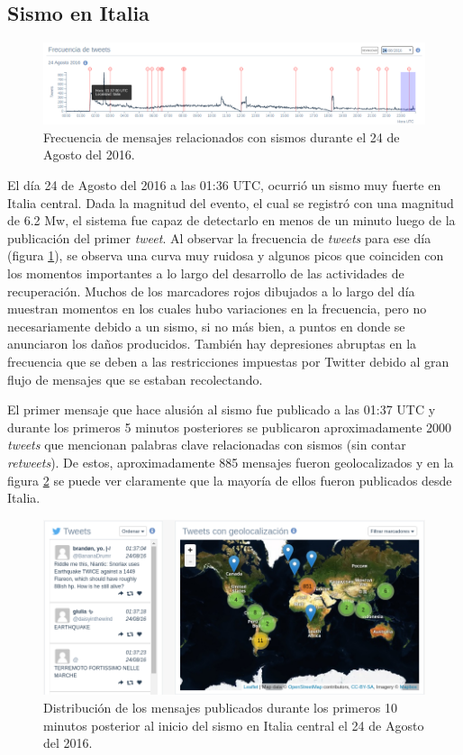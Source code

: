 	\subsection{Sismo en Italia}
	
	\begin{figure}[!h]
	  \centering
	  \includegraphics[width=\textwidth]{imagenes/sismoitaliafreq.png}
	  \caption{Frecuencia de mensajes relacionados con sismos durante el 24 de Agosto del 2016.}
		\label{fig:timeline-italia} 
	\end{figure}
	
	El día 24 de Agosto del 2016 a las 01:36 UTC, ocurrió un sismo muy fuerte en Italia central. Dada la magnitud del evento, el cual se registró con una magnitud de 6.2 Mw, el sistema fue capaz de detectarlo en menos de un minuto luego de la publicación del primer \textit{tweet}. Al observar la frecuencia de \textit{tweets} para ese día (figura \ref{fig:timeline-italia}), se observa una curva muy ruidosa y algunos picos que coinciden con los momentos importantes a lo largo del desarrollo de las actividades de recuperación. Muchos de los marcadores rojos dibujados a lo largo del día muestran momentos en los cuales hubo variaciones en la frecuencia, pero no necesariamente debido a un sismo, si no más bien, a puntos en donde se anunciaron los daños producidos. También hay depresiones abruptas en la frecuencia que se deben a las restricciones impuestas por Twitter debido al gran flujo de mensajes que se estaban recolectando. 
	
	El primer mensaje que hace alusión al sismo fue publicado a las 01:37 UTC y durante los primeros 5 minutos posteriores se publicaron aproximadamente 2000 \textit{tweets} que mencionan palabras clave relacionadas con sismos (sin contar \textit{retweets}). De estos, aproximadamente 885 mensajes fueron geolocalizados y en la figura \ref{fig:sismoitalia} se puede ver claramente que la mayoría de ellos fueron publicados desde Italia.
	
	\begin{figure}[!h]
	  \centering
	  \includegraphics[width=\textwidth]{imagenes/sismoitalia.png}
	  \caption{Distribución de los mensajes publicados durante los primeros 10 minutos posterior al inicio del sismo en Italia central el 24 de Agosto del 2016.}
		\label{fig:sismoitalia}
	\end{figure}	
	
